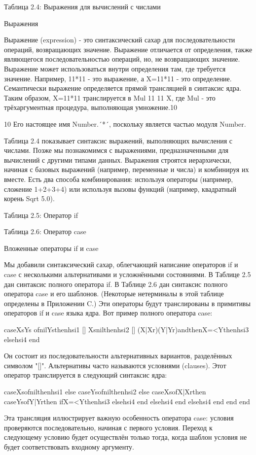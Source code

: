 Таблица 2.4: Выражения для вычислений с числами

Выражения

Выражение (expression) - это синтаксический сахар для последовательности операций, возвращающих значение. Выражение отличается от определения, также являющегося последовательностью операций, но, не возвращающих значение. Выражение может использоваться внутри определения там, где требуется значение. Например, 11*11 - это выражение, а X=11*11 - это определение. Семантически выражение определяется прямой трансляцией в синтаксис ядра. Таким образом, X=11*11 транслируется в {Mul 11 11 X}, где Mul - это трёхаргументная процедура, выполняющая умножение.10

10 Его настоящее имя Number.´*´, поскольку является частью модуля Number.

Таблица 2.4 показывает синтаксис выражений, выполняющих вычисления с числами. Позже мы познакомимся с выражениями, предназначенными для вычислений с другими типами данных. Выражения строятся иерархически, начиная с базовых выражений (например, переменные и числа) и комбинируя их вместе. Есть два способа комбинирования: используя операторы (например, сложение 1+2+3+4) или используя вызовы функций (например, квадратный корень {Sqrt 5.0}).

Таблица 2.5: Оператор if

Таблица 2.6: Оператор case

Вложенные операторы if и case

Мы добавили синтаксический сахар, облегчающий написание операторов if и case с несколькими альтернативами и усложнёнными состояниями. В Таблице 2.5 дан синтаксис полного оператора if. В Таблице 2.6 дан синтаксис полного оператора case и его шаблонов. (Некоторые нетерминалы в этой таблице определены в Приложении C.) Эти операторы будут транслированы в примитивы операторов if и case языка ядра. Вот пример полного оператора case:

caseXsYs
ofnilYsthenhsi1
[] Xsnilthenhsi2
[] (X|Xr)(Y|Yr)andthenX=<Ythenhsi3
elsehsi4 end

Он состоит из последовательности альтернативных вариантов, разделённых символом "[]". Альтернативы часто называются условиями (clauses). Этот оператор транслируется в следующий синтаксис ядра:

caseXsofnilthenhsi1
else
caseYsofnilthenhsi2
else
caseXsofX|Xrthen
caseYsofY|Yrthen
ifX=<Ythenhsi3 elsehsi4 end
elsehsi4 end
elsehsi4 end
end
end

Эта трансляция иллюстрирует важную особенность оператора case: условия проверяются последовательно, начиная с первого условия. Переход к следующему условию будет осуществлён только тогда, когда шаблон условия не будет соответствовать входному аргументу.

